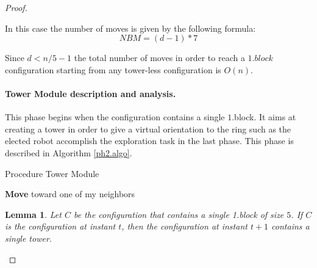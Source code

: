 \documentclass[12pt]{llncs}
\newtheorem{lem}{Lemma}
\begin{document}
\begin{proof}
\begin{enumerate}
\begin{itemize}
In this case the number of moves is given by the following formula:
\begin{equation}
    NBM= (d-1)*7
   \label{max5}
 \end{equation} 
\end{itemize}
\end{enumerate}







Since $d< n/5-1$ the total number of moves in order to reach a $1.block$ configuration starting from any tower-less configuration is  $O(n)$.

\paragraph{Tower Module description and analysis.}\label{sec:ph2}

This phase begins when the configuration contains a single $1$.block. It aims at creating a tower in order to give a virtual orientation to the ring such as the elected robot accomplish the exploration task in the last phase. 
This phase is described in Algorithm \ref{ph2.algo}.
{\footnotesize
\begin{algorithm}[htbp]
  \caption{Procedure Tower Module}
  \label{ph2.algo}
 \begin{algorithmic}[1]
    \State \textbf{Move} toward one of my neighbors
\EndIf
  \end{algorithmic}
\end{algorithm} 
}
\begin{lem}
\label{lem:tower}
Let $C$ be the configuration that contains a single 1.block of size $5$. If $C$ is the configuration at instant $t$, then the configuration at instant $t+1$ contains a single tower. 
\end{lem}


\end{proof}
\end{document}

